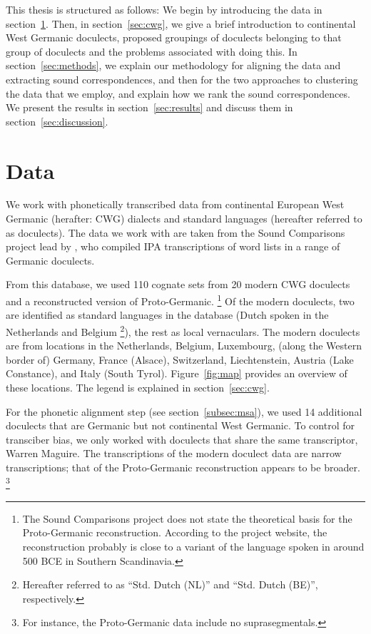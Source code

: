 \documentclass[a4paper]{article}
\begin{document}
This thesis is structured as follows:
We begin by introducing the data in section~\ref{sec:data}.
Then, in section~\ref{sec:cwg},
we give a brief introduction to continental West Germanic doculects,
proposed groupings of doculects belonging to that group of doculects
and the problems associated with doing this.
In section~\ref{sec:methods}, we explain our methodology for
aligning the data and extracting sound correspondences,
and then for the two approaches to clustering the data that we employ,
and explain how we rank the sound correspondences.
We present the results in section~\ref{sec:results}
and discuss them in section~\ref{sec:discussion}.

\section{Data}
\label{sec:data}

We work with phonetically transcribed data from
continental European West Germanic (herafter: CWG) dialects and standard languages
(hereafter referred to as doculects).
The data we work with are taken from the Sound Comparisons project
lead by \citet{heggarty2018sound}, who compiled IPA transcriptions of word lists
in a range of Germanic doculects.

From this database,
we used 110 cognate sets from 20 modern CWG doculects
and a reconstructed version of Proto-Germanic.
\footnote{
The Sound Comparisons project does not state
the theoretical basis for the Proto-Germanic reconstruction.
According to the project website,
the reconstruction probably is close to
a variant of the language spoken in around 500 BCE
in Southern Scandinavia.
}
Of the modern doculects, two are identified as standard languages
in the database (Dutch spoken in the Netherlands and Belgium
\footnote{
Hereafter referred to as ``Std. Dutch (NL)'' and ``Std. Dutch (BE)'', respectively.
}),
the rest as local vernaculars.
The modern doculects are from locations in the
Netherlands, Belgium, Luxembourg, (along the Western border of) Germany,
France (Alsace), Switzerland, Liechtenstein, Austria (Lake Constance), and Italy (South Tyrol).
Figure~\ref{fig:map} provides an overview of these locations.
The legend is explained in section~\ref{sec:cwg}.

For the phonetic alignment step (see section~\ref{subsec:msa}),
we used 14 additional doculects that are Germanic but not continental West Germanic. 
To control for transciber bias,
we only worked with doculects that share the same transcriptor,
Warren Maguire.
The transcriptions of the modern doculect data
are narrow transcriptions;
that of the Proto-Germanic reconstruction appears to be broader.
\footnote{
For instance, the Proto-Germanic data include no suprasegmentals.
}
\end{document}
